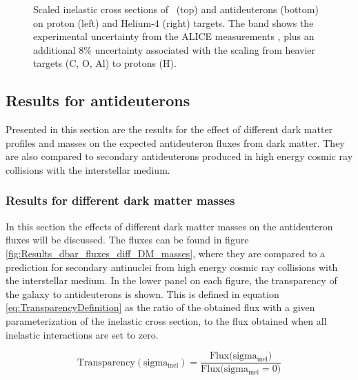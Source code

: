 \begin{figure}
    \caption{Scaled inelastic cross sections of \ahe\ (top) and antideuterons (bottom) on proton (left) and Helium-4 (right) targets. The band shows the experimental uncertainty from the ALICE measurements \cite{}, plus an additional 8\% uncertainty associated with the scaling from heavier targets (C, O, Al) to protons (H).}
    \label{fig:ScaledXS_ahe_adeut}
\end{figure}


\subsection{Results for antideuterons}
Presented in this section are the results for the effect of different dark matter profiles and masses on the expected antideuteron fluxes from dark matter. They are also compared to secondary antideuterons produced in high energy cosmic ray collisions with the interstellar medium. 

\subsubsection{Results for different dark matter masses}
In this section the effects of different dark matter masses on the antideuteron fluxes will be discussed. The fluxes can be found in figure \ref{fig:Results_dbar_fluxes_diff_DM_masses}, where they are compared to a prediction for secondary antinuclei from high energy cosmic ray collisions with the interstellar medium. In the lower panel on each figure, the transparency of the galaxy to antideuterons is shown. This is defined in equation \ref{eq:TransparencyDefinition} as the ratio of the obtained flux with a given parameterization of the inelastic cross section, to the flux obtained when all inelastic interactions are set to zero.

\begin{equation}\label{eq:TransparencyDefinition}
    \mathrm{Transparency(sigma_{inel})} = \frac{\mathrm{Flux(sigma_{inel}})}{\mathrm{Flux(sigma_{inel}=0})} 
\end{equation}


